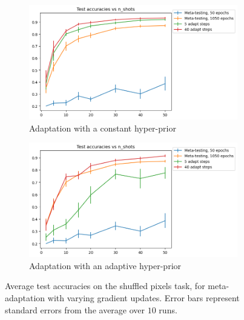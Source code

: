 \documentclass[letterpaper]{article} %
\theoremstyle{definition}
\begin{document}
\begin{figure}[h!]
	\centering
	\begin{subfigure}[b]{0.4\textwidth}
		\centering
		\includegraphics[width=\textwidth]{test_accuracies_pixels_const}
		\caption{Adaptation with a constant hyper-prior}
	\end{subfigure}
	\hfill
	\begin{subfigure}[b]{0.4\textwidth}
		\centering
		\includegraphics[width=\textwidth]{test_accuracies_pixels_var}
		\caption{Adaptation with an adaptive hyper-prior}	 	
	\end{subfigure}
	\hfill
	\caption{Average test accuracies on the shuffled pixels task, for meta-adaptation with varying gradient updates. Error bars represent standard errors from the average over $10$ runs.}	 
	\label{fig:results-pixels}
\end{figure}
\end{document}
